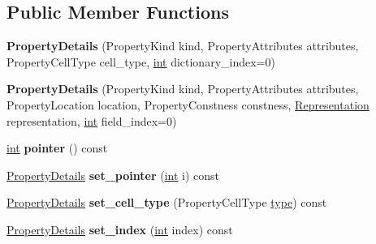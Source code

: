 \subsection*{Public Member Functions}
\begin{DoxyCompactItemize}
\item 
\mbox{\label{classv8_1_1internal_1_1PropertyDetails_a0a0b675362cea435412996b60bc2b013}} 
{\bfseries Property\+Details} (Property\+Kind kind, Property\+Attributes attributes, Property\+Cell\+Type cell\+\_\+type, \mbox{\hyperlink{classint}{int}} dictionary\+\_\+index=0)
\item 
\mbox{\label{classv8_1_1internal_1_1PropertyDetails_a6e73d58ecdf7637297fee4cff5735133}} 
{\bfseries Property\+Details} (Property\+Kind kind, Property\+Attributes attributes, Property\+Location location, Property\+Constness constness, \mbox{\hyperlink{classv8_1_1internal_1_1Representation}{Representation}} representation, \mbox{\hyperlink{classint}{int}} field\+\_\+index=0)
\item 
\mbox{\label{classv8_1_1internal_1_1PropertyDetails_a0f703d7edfdae22b1b760b8e27f7b2fe}} 
\mbox{\hyperlink{classint}{int}} {\bfseries pointer} () const
\item 
\mbox{\label{classv8_1_1internal_1_1PropertyDetails_af35118c94c3ec2e26d6ff018c7432f71}} 
\mbox{\hyperlink{classv8_1_1internal_1_1PropertyDetails}{Property\+Details}} {\bfseries set\+\_\+pointer} (\mbox{\hyperlink{classint}{int}} i) const
\item 
\mbox{\label{classv8_1_1internal_1_1PropertyDetails_acea4c550f0ffed6a827a3b4903ac33bd}} 
\mbox{\hyperlink{classv8_1_1internal_1_1PropertyDetails}{Property\+Details}} {\bfseries set\+\_\+cell\+\_\+type} (Property\+Cell\+Type \mbox{\hyperlink{classstd_1_1conditional_1_1type}{type}}) const
\item 
\mbox{\label{classv8_1_1internal_1_1PropertyDetails_a8a8b77dd9dca0ea49cde28ccf89c97ec}} 
\mbox{\hyperlink{classv8_1_1internal_1_1PropertyDetails}{Property\+Details}} {\bfseries set\+\_\+index} (\mbox{\hyperlink{classint}{int}} index) const

\end{DoxyCompactItemize}
